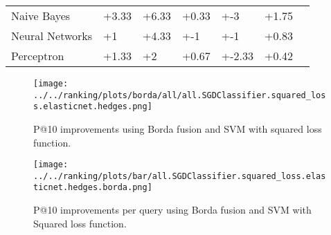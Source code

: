 \begin{table}[h!]
{\begin{tabular}{@{}lllllll@{}}
Naive Bayes                                              & +3.33           & +6.33              & +0.33           & +-3                & +1.75          \\
Neural Networks                                         & +1              & +4.33              & +-1             & +-1                & +0.83          \\
Perceptron                                              & +1.33           & +2                 & +0.67           & +-2.33             & +0.42         \\\bottomrule
\end{tabular}%
}
\end{table}

\begin{figure}
\centerline{
  \texttt{[image: ../../ranking/plots/borda/all/all.SGDClassifier.squared\_loss.elasticnet.hedges.png]}
  }
  \caption{P@10 improvements using Borda fusion and SVM with squared loss function.}
\end{figure}



\begin{figure}
\centerline{
  \texttt{[image: ../../ranking/plots/bar/all.SGDClassifier.squared\_loss.elasticnet.hedges.borda.png]}
  }
  \caption{P@10 improvements per query using Borda fusion and SVM with Squared loss function.}
\end{figure}






